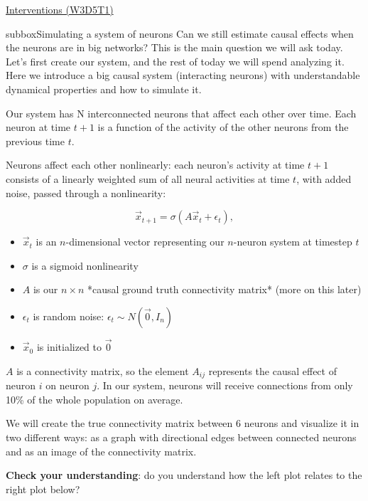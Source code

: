 \begin{textbox}{\href{https://compneuro.neuromatch.io/tutorials/W3D5_NetworkCausality/student/W3D5_Tutorial1.html}{Interventions (W3D5T1)}   }
\begin{subbox}{subbox}{Simulating a system of neurons}
\scriptsize
Can we still estimate causal effects when the neurons are in big networks? This is the main question we will ask today. Let's first create our system, and the rest of today we will spend analyzing it.
Here we introduce a big causal system (interacting neurons) with understandable dynamical properties and how to simulate it.

Our system has N interconnected neurons that affect each other over time. Each neuron at time $t+1$ is a function of the activity of the other neurons from the previous time $t$. 

Neurons affect each other nonlinearly: each neuron's activity at time $t+1$ consists of a linearly weighted sum of all neural activities at time $t$, with added noise, passed through a nonlinearity:

\begin{equation*}
\vec{x}_{t+1} = \sigma(A\vec{x}_t + \epsilon_t),
\end{equation*}
\begin{itemize}
    \item 
 $\vec{x}_t$ is an $n$-dimensional vector representing our $n$-neuron system at timestep $t$
  \item $\sigma$ is a sigmoid nonlinearity
  \item $A$ is our $n \times n$ *causal ground truth connectivity matrix* (more on this later)
  \item $\epsilon_t$ is random noise: $\epsilon_t \sim N(\vec{0}, I_n)$
  \item $\vec{x}_0$ is initialized to $\vec{0}$
\end{itemize}

$A$ is a connectivity matrix, so the element $A_{ij}$ represents the causal effect of neuron $i$ on neuron $j$. In our system, neurons will receive connections from only 10\% of the whole population on average.

We will create the true connectivity matrix between 6 neurons and visualize it in two different ways: as a graph with directional edges between connected neurons and as an image of the connectivity matrix.

\textbf{Check your understanding}: do you understand how the left plot relates to the right plot below?
\begin{center}
    

\end{center}
\end{subbox}
\end{textbox}
